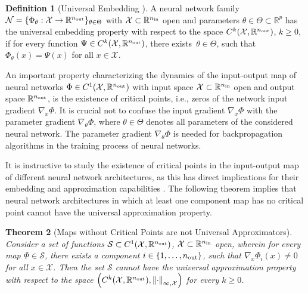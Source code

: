 \documentclass[10pt]{article}
\newtheorem{theorem}{Theorem}[section]
\theoremstyle{definition}
\newtheorem{definition}[theorem]{Definition}
\numberwithin{equation}{section}
\newcommand\norm[1]{\left\lVert#1\right\rVert}
\newcommand{\R}{\mathbb{R}}
\newcommand*{\nout}{n_\textup{out}}
\newcommand*{\nin}{n_\textup{in}}
\begin{document}
\begin{definition}[Universal Embedding \cite{kk2025}]
    A neural network family $\mathcal{N} = \{\Phi_\theta: \mathcal{X} \rightarrow \R^{\nout}\}_{\theta \in \Theta}$ with $\mathcal{X}\subset \R^{\nin}$ open and parameters $\theta\in \Theta \subset \R^p$ has the universal embedding property with respect to the space $C^k(\mathcal{X},\R^{\nout})$, $k \geq 0$, if for every function $\Psi \in C^k(\mathcal{X},\R^{\nout})$, there exists~$\theta\in \Theta$, such that $\Phi_\theta(x) = \Psi(x)$ for all $x \in \mathcal{X}$.
\end{definition}

An important property characterizing the dynamics of the input-output map of neural networks $\Phi \in C^1(\mathcal{X},\R^{\nout})$ with input space $\mathcal{X}\subset \R^{\nin}$ open and output space $\R^{\nout}$, is the existence of critical points, i.e., zeros of the network input gradient $\nabla_x \Phi$. It is crucial not to confuse the input gradient $\nabla_x \Phi$ with the parameter gradient $\nabla_\theta \Phi$, where $\theta\in\Theta$ denotes all parameters of the considered neural network. The parameter gradient $\nabla_\theta \Phi$ is needed for backpropagation algorithms in the training process of neural networks.

It is instructive to study the existence of critical points in the input-output map of different neural network architectures, as this has direct implications for their embedding and approximation capabilities \cite{kk2025}. The following theorem implies that neural network architectures in which at least one component map has no critical point cannot have the universal approximation property.

\begin{theorem}[Maps without Critical Points are not Universal Approximators]
	\label{th:uniapprox}
	Consider a set of functions $\mathcal{S}\subset C^1(\mathcal{X},\R^{\nout})$, $\mathcal{X}\subset \R^{\nin}$ open, wherein for every map $\Phi \in \mathcal{S}$, there exists a component $i\in \{1,\ldots,\nout\}$, such that $\nabla_x\Phi_i(x) \neq 0$ for all $x\in \mathcal{X}$. 
	Then the set $\mathcal{S}$ cannot have the universal approximation property with respect to the space $\left( C^k(\mathcal{X},\R^{\nout}), \norm{\cdot}_{\infty,\mathcal{X}}\right)$ for every $k \geq 0$.
\end{theorem}
\end{document}
